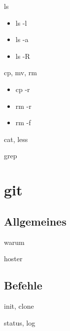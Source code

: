 \documentclass[t]{beamer}
\begin{document}
      \begin{frame}{ls}
        \begin{itemize}
          \item ls -l\\
          \item ls -a\\
          \item ls -R
        \end{itemize}
      \end{frame}

      \begin{frame}{cp, mv, rm}
        \begin{itemize}
          \item cp -r\\
          \item rm -r\\
          \item rm -f
        \end{itemize}
      \end{frame}

      \begin{frame}{cat, less}
      \end{frame}

      \begin{frame}{grep}
      \end{frame}

  \section{git}
    \subsection{Allgemeines}
      \begin{frame}{warum}
      \end{frame}

      \begin{frame}{hoster}
      \end{frame}

    \subsection{Befehle}
      \begin{frame}{init, clone}
      \end{frame}

      \begin{frame}{status, log}
      \end{frame}
\end{document}
